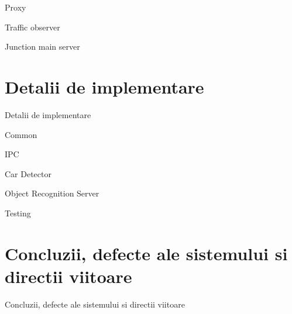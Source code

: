 \documentclass{beamer}
\begin{document}
    \begin{frame}{Proxy}
    
    \end{frame}

    \begin{frame}{Traffic observer}
    
    \end{frame}

    \begin{frame}{Junction main server}
    
    \end{frame}

\section{Detalii de implementare}
    \begin{frame}{Detalii de implementare}

    \end{frame}

    \begin{frame}{Common}
        
    \end{frame}

    \begin{frame}{IPC}
        
    \end{frame}

    \begin{frame}{Car Detector}
        
    \end{frame}

    \begin{frame}{Object Recognition Server}
        
    \end{frame}

    \begin{frame}{Testing}
        
    \end{frame}

\section{Concluzii, defecte ale sistemului si directii viitoare}
    \begin{frame}{Concluzii, defecte ale sistemului si directii viitoare}

    \end{frame}
\end{document}
